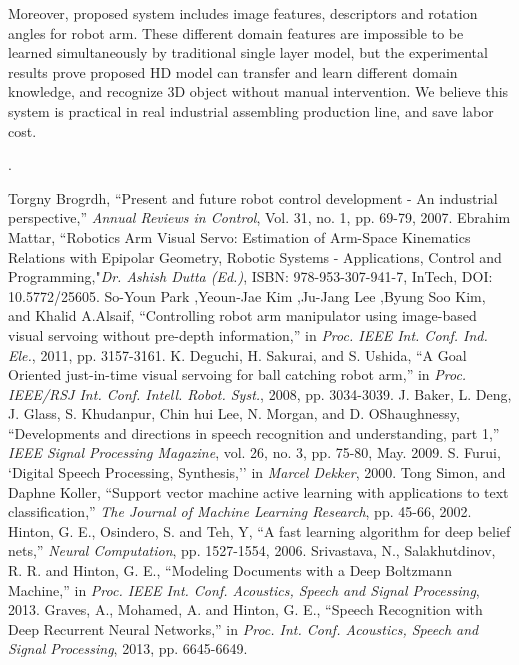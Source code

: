 \documentclass[journal]{IEEEtran}
\begin{document}
Moreover, proposed system includes image features, descriptors and rotation angles for robot arm. These different domain features are impossible to be learned simultaneously by traditional single layer model, but the experimental results prove proposed HD model can transfer and learn different domain knowledge, and recognize 3D object without manual intervention. We believe this system is practical in real industrial assembling production line, and save labor cost.


 

.
\ifCLASSOPTIONcaptionsoff
  \newpage
\fi




\begin{thebibliography}{1}
 Torgny Brogrdh, ``Present and future robot control development - An industrial perspective,'' \textit{Annual Reviews in Control}, Vol. 31, no. 1, pp. 69-79, 2007.
 Ebrahim Mattar, ``Robotics Arm Visual Servo: Estimation of Arm-Space Kinematics Relations with Epipolar Geometry, Robotic Systems - Applications, Control and Programming,"\textit{Dr. Ashish Dutta (Ed.)}, ISBN: 978-953-307-941-7, InTech, DOI: 10.5772/25605.
 So-Youn Park ,Yeoun-Jae Kim ,Ju-Jang Lee ,Byung Soo Kim, and Khalid A.Alsaif, ``Controlling robot arm manipulator using image-based visual servoing without pre-depth information,'' in \textit{Proc. IEEE Int. Conf. Ind. Ele.}, 2011, pp. 3157-3161.
 K. Deguchi, H. Sakurai, and S. Ushida, ``A Goal Oriented just-in-time visual servoing for ball catching robot arm,'' in \textit{Proc. IEEE/RSJ Int. Conf. Intell. Robot. Syst.}, 2008, pp. 3034-3039.
 J. Baker, L. Deng, J. Glass, S. Khudanpur, Chin hui Lee, N. Morgan, and D. OShaughnessy, ``Developments and directions in speech recognition and understanding, part 1,'' \textit{IEEE Signal Processing Magazine}, vol. 26, no. 3, pp. 75-80, May. 2009.
 S. Furui, `Digital Speech Processing, Synthesis,'' in \textit{Marcel Dekker}, 2000.
 Tong Simon, and Daphne Koller, ``Support vector machine active learning with applications to text classification,'' \textit{The Journal of Machine Learning Research}, pp. 45-66, 2002.
 Hinton, G. E., Osindero, S. and Teh, Y, ``A fast learning algorithm for deep belief nets,'' \textit{Neural Computation}, pp. 1527-1554, 2006.
 Srivastava, N., Salakhutdinov, R. R. and Hinton, G. E., ``Modeling Documents with a Deep Boltzmann Machine,'' in \textit{Proc. IEEE Int. Conf. Acoustics, Speech and Signal Processing}, 2013.
 Graves, A., Mohamed, A. and Hinton, G. E., ``Speech Recognition with Deep Recurrent Neural Networks,'' in \textit{ Proc. Int. Conf. Acoustics, Speech and Signal Processing}, 2013, pp. 6645-6649. 

\end{thebibliography}
\end{document}
